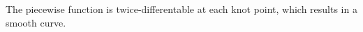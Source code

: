 







The piecewise function is twice-differentable at each knot point, which results in a smooth curve.





